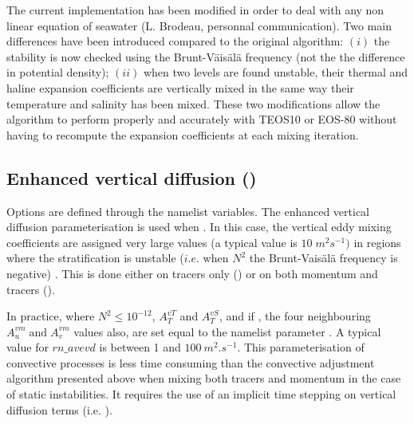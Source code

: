 \documentclass[../tex_main/NEMO_manual]{subfiles}
\begin{document}
The current implementation has been modified in order to deal with any non linear equation of seawater
(L. Brodeau, personnal communication).
Two main differences have been introduced compared to the original algorithm:
$(i)$ the stability is now checked using the Brunt-V\"{a}is\"{a}l\"{a} frequency 
(not the the difference in potential density); 
$(ii)$ when two levels are found unstable, their thermal and haline expansion coefficients are vertically mixed in
the same way their temperature and salinity has been mixed.
These two modifications allow the algorithm to perform properly and accurately with TEOS10 or EOS-80 without
having to recompute the expansion coefficients at each mixing iteration.

\subsection{Enhanced vertical diffusion (\protect{})}
\label{subsec:ZDF_evd}



Options are defined through the   namelist variables.
The enhanced vertical diffusion parameterisation is used when .
In this case, the vertical eddy mixing coefficients are assigned very large values
(a typical value is $10\;m^2s^{-1})$ in regions where the stratification is unstable
($i.e.$ when $N^2$ the Brunt-Vais\"{a}l\"{a} frequency is negative) \citep{Lazar_PhD97, Lazar_al_JPO99}.
This is done either on tracers only () or
on both momentum and tracers ().

In practice, where $N^2\leq 10^{-12}$, $A_T^{vT}$ and $A_T^{vS}$, and if ,
the four neighbouring $A_u^{vm} \;\mbox{and}\;A_v^{vm}$ values also, are set equal to
the namelist parameter .
A typical value for $rn\_avevd$ is between 1 and $100~m^2.s^{-1}$.
This parameterisation of convective processes is less time consuming than
the convective adjustment algorithm presented above when mixing both tracers and
momentum in the case of static instabilities.
It requires the use of an implicit time stepping on vertical diffusion terms
(i.e. ).
\end{document}
